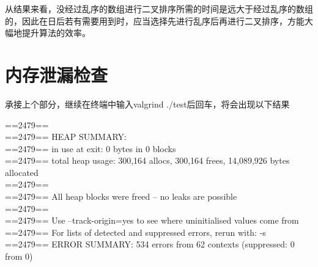 \documentclass[UTF8]{ctexart}
\begin{document}
从结果来看，没经过乱序的数组进行二叉排序所需的时间是远大于经过乱序的数组的，因此在日后若有需要用到时，应当选择先进行乱序后再进行二叉排序，方能大幅地提升算法的效率。

\section{内存泄漏检查}

承接上个部分，继续在终端中输入valgrind ./test后回车，将会出现以下结果

\begin{flushleft}
==2479== \\
==2479== HEAP SUMMARY: \\
==2479==     in use at exit: 0 bytes in 0 blocks \\
==2479==   total heap usage: 300,164 allocs, 300,164 frees, 14,089,926 bytes allocated \\
==2479== \\
==2479== All heap blocks were freed -- no leaks are possible \\
==2479== \\
==2479== Use --track-origin=yes to see where uninitialised values come from\\
==2479== For lists of detected and suppressed errors, rerun with: -s \\
==2479== ERROR SUMMARY: 534 errors from 62 contexts (suppressed: 0 from 0) \\
\end{flushleft}
\end{document}
